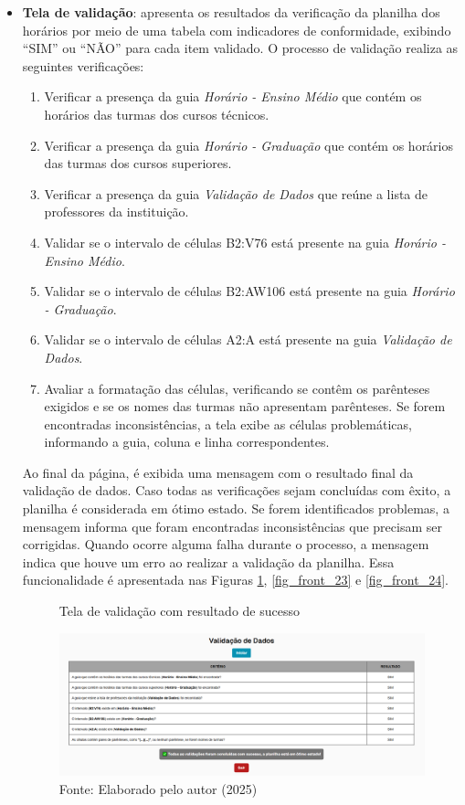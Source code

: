 \begin{itemize}
    \item \textbf{Tela de validação}: apresenta os resultados da verificação da planilha dos horários por meio de uma tabela com indicadores de conformidade, exibindo ``SIM'' ou ``NÃO'' para cada item validado. O processo de validação realiza as seguintes verificações:
    \begin{enumerate}
        \item Verificar a presença da guia \textit{Horário - Ensino Médio} que contém os horários das turmas dos cursos técnicos.
        \item Verificar a presença da guia \textit{Horário - Graduação} que contém os horários das turmas dos cursos superiores.
        \item Verificar a presença da guia \textit{Validação de Dados} que reúne a lista de professores da instituição.
        \item Validar se o intervalo de células B2:V76 está presente na guia \textit{Horário - Ensino Médio}.
        \item Validar se o intervalo de células B2:AW106 está presente na guia \textit{Horário - Graduação}.
        \item Validar se o intervalo de células A2:A está presente na guia \textit{Validação de Dados}.
        \item Avaliar a formatação das células, verificando se contêm os parênteses exigidos e se os nomes das turmas não apresentam parênteses. Se forem encontradas inconsistências, a tela exibe as células problemáticas, informando a guia, coluna e linha correspondentes.
    \end{enumerate}

    Ao final da página, é exibida uma mensagem com o resultado final da validação de dados. Caso todas as verificações sejam concluídas com êxito, a planilha é considerada em ótimo estado. Se forem identificados problemas, a mensagem informa que foram encontradas inconsistências que precisam ser corrigidas. Quando ocorre alguma falha durante o processo, a mensagem indica que houve um erro ao realizar a validação da planilha. Essa funcionalidade é apresentada nas Figuras \ref{fig_front_22}, \ref{fig_front_23} e \ref{fig_front_24}.

    \begin{figure}[htb]
        \centering 
        \caption{Tela de validação com resultado de sucesso}
        \includegraphics[width=1\textwidth]{Figuras/front-22.png}
        \caption*{Fonte: Elaborado pelo autor (2025)}
        \label{fig_front_22}
    \end{figure}


\end{itemize}
